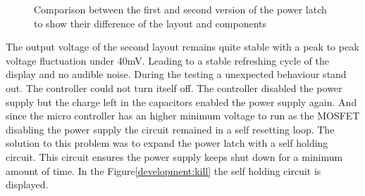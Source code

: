\begin{figure}[!ht]
	\caption{Comparison between the first and second version of the power latch to show their difference of the layout and components}
	\label{fig:pwr_layout}
\end{figure}

The output voltage of the second layout remains quite stable with a peak to peak voltage fluctuation under 40mV. Leading to a stable refreshing cycle of the display and no audible noise. During the testing a unexpected behaviour stand out. The controller could not turn itself off. The controller disabled the power supply but the charge left in the capacitors enabled the power supply again. And since the micro controller has an higher minimum voltage to run as the MOSFET disabling the power supply the circuit remained in a self resetting loop. The solution to this problem was to expand the power latch with a self holding circuit. This circuit ensures the power supply keeps shut down for a minimum amount of time. In the Figure\ref{development:kill} the self holding circuit is displayed. 

